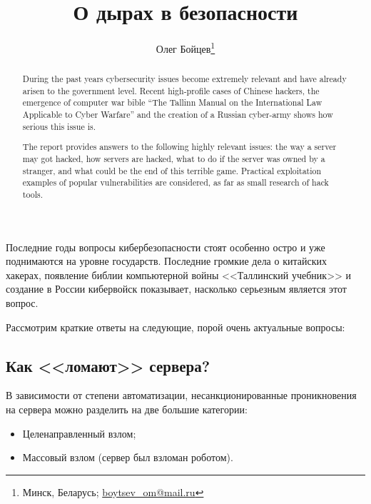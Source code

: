 \documentclass[10pt, a5paper]{article}
\begin{document}
\title{О дырах в безопасности}%

\author{Олег Бойцев\footnote{Минск, Беларусь; \url{boytsev_om@mail.ru}}}
\maketitle

\begin{abstract}
During the past years cybersecurity issues become extremely relevant and have already arisen to the government level. Recent high-profile cases of Chinese hackers, the emergence of computer war bible ``The Tallinn Manual on the International Law \linebreak Applicable to Cyber Warfare'' and the creation of a Russian cyber-army shows how serious this issue is.

The report provides answers to the following highly relevant issues: the way a server may got hacked, how servers are hacked, what to do if the server was owned by a stranger, and what could be the end of this terrible game. Practical exploitation examples of popular vulnerabilities are considered, as far as small research of hack tools.
\end{abstract}

Последние годы вопросы кибербезопасности стоят особенно остро и уже поднимаются на уровне государств. Последние громкие дела о китайских хакерах, появление библии компьютерной войны <<Таллинский учебник>> и создание в России кибервойск показывает, насколько серьезным является этот вопрос.

Рассмотрим краткие ответы на следующие, порой очень актуальные вопросы:

\subsection*{Как <<ломают>> сервера?}

В зависимости от степени автоматизации, несанкционированные проникновения на сервера можно разделить на две большие категории:

\begin{itemize}
  \item Целенаправленный взлом;
  \item Массовый взлом (сервер был взломан роботом).
\end{itemize}
\end{document}
